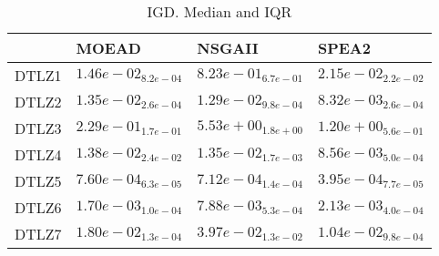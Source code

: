 \documentclass{article}
\begin{document}
\
\begin{table}
\caption{IGD. Median and IQR}
\label{table:median.IGD}
\begin{scriptsize}
\centering
\begin{tabular}{llll}
\hline & MOEAD & NSGAII &  SPEA2\\
\hline
DTLZ1 & \cellcolor{gray95}$  1.46e-02_{ 8.2e-04}$ & $  8.23e-01_{ 6.7e-01}$ & $  2.15e-02_{ 2.2e-02}$ \\
DTLZ2 & $  1.35e-02_{ 2.6e-04}$ & \cellcolor{gray25}$  1.29e-02_{ 9.8e-04}$ & \cellcolor{gray95}$  8.32e-03_{ 2.6e-04}$ \\
DTLZ3 & \cellcolor{gray95}$  2.29e-01_{ 1.7e-01}$ & $  5.53e+00_{ 1.8e+00}$ & $  1.20e+00_{ 5.6e-01}$ \\
DTLZ4 & $  1.38e-02_{ 2.4e-02}$ & \cellcolor{gray25}$  1.35e-02_{ 1.7e-03}$ & \cellcolor{gray95}$  8.56e-03_{ 5.0e-04}$ \\
DTLZ5 & $  7.60e-04_{ 6.3e-05}$ & \cellcolor{gray25}$  7.12e-04_{ 1.4e-04}$ & \cellcolor{gray95}$  3.95e-04_{ 7.7e-05}$ \\
DTLZ6 & \cellcolor{gray95}$  1.70e-03_{ 1.0e-04}$ & $  7.88e-03_{ 5.3e-04}$ & $  2.13e-03_{ 4.0e-04}$ \\
DTLZ7 & \cellcolor{gray25}$  1.80e-02_{ 1.3e-04}$ & $  3.97e-02_{ 1.3e-02}$ & \cellcolor{gray95}$  1.04e-02_{ 9.8e-04}$ \\
\hline
\end{tabular}
\end{scriptsize}
\end{table}
\end{document}
